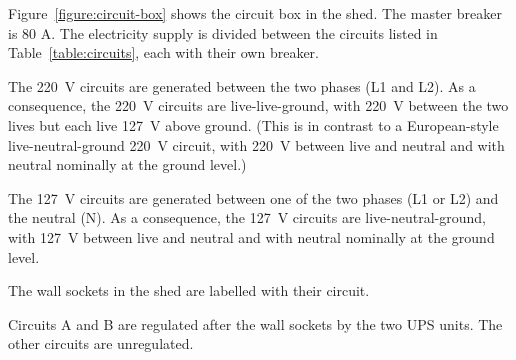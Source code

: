 Figure~\ref{figure:circuit-box} shows the circuit box in the shed. The master breaker is 80 A. The electricity supply is divided between the circuits listed in Table~\ref{table:circuits}, each with their own breaker. 

The 220~V circuits are generated between the two phases (L1 and L2). As a consequence, the 220~V circuits are live-live-ground, with 220~V between the two lives but each live 127~V above ground. (This is in contrast to a European-style live-neutral-ground 220~V circuit, with 220~V between live and neutral and with neutral nominally at the ground level.)

The 127~V circuits are generated between one of the two phases (L1 or L2) and the neutral (N). As a consequence, the 127~V circuits are live-neutral-ground, with 127~V between live and neutral and with neutral nominally at the ground level.

The wall sockets in the shed are labelled with their circuit.

Circuits A and B are regulated after the wall sockets by the two UPS units. The other circuits are unregulated. 

\begin{table}
\caption{Circuits}
\label{table:circuits}
\begin{center}
\small
{}
\end{center}
\end{table}

